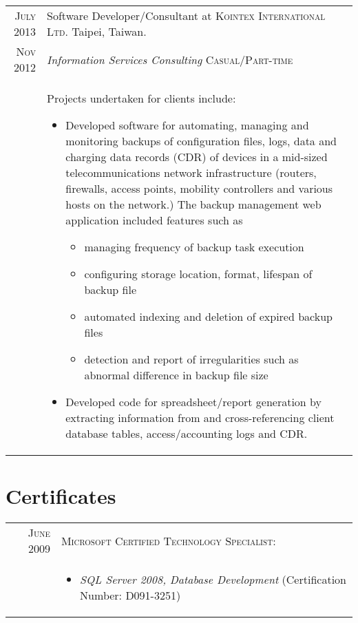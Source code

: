 \documentclass[a4paper,10pt]{article} %
\begin{document}
\begin{tabular}{r|p{12.2cm}}
\textsc{July 2013} & Software Developer/Consultant at \textsc{Kointex International Ltd}. Taipei, Taiwan.\\
\textsc{Nov 2012} & \emph{Information Services Consulting} \hfill \textsc{Casual/Part-time}\\
& \footnotesize{
Projects undertaken for clients include:
\begin{itemize}
\item Developed software for automating, managing and monitoring backups of configuration files, logs, data and charging data records (CDR) of devices in a mid-sized telecommunications network infrastructure (routers, firewalls, access points, mobility controllers and various hosts on the network.) The backup management web application included features such as 
\begin{itemize}
\item managing frequency of backup task execution
\item configuring storage location, format, lifespan of backup file
\item automated indexing and deletion of expired backup files
\item detection and report of irregularities such as abnormal difference in backup file size 
\end{itemize}
\item Developed code for spreadsheet/report generation by extracting information from and cross-referencing client database tables, access/accounting logs and CDR.
\end{itemize}}


\end{tabular}


\section{Certificates}

\begin{tabular}{rl}

\textsc{June} 2009 	&\textsc{Microsoft Certified Technology Specialist:} \\ 
				& \parbox{0.9\textwidth}{
				\begin{itemize}
				\item	\emph{SQL Server 2008, Database Development} (Certification Number: D091-3251)
				\end{itemize}
				 }

\end{tabular}
\end{document}
